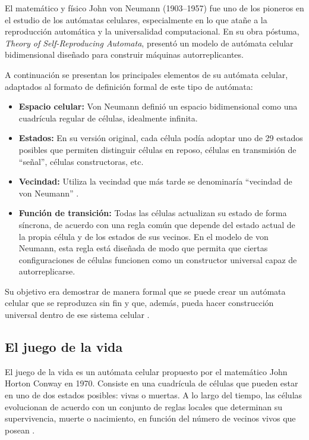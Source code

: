 El matemático y físico John von Neumann (1903--1957) fue uno de los pioneros en el estudio de los autómatas celulares, especialmente en lo que atañe a la reproducción automática y la universalidad computacional. En su obra póstuma, \textit{Theory of Self-Reproducing Automata}, presentó un modelo de autómata celular bidimensional diseñado para construir máquinas autorreplicantes. 

A continuación se presentan los principales elementos de su autómata celular, adaptados al formato de definición formal de este tipo de autómata:

\begin{itemize}
	
	\item \textbf{Espacio celular:} Von Neumann definió un espacio bidimensional como una cuadrícula regular de células, idealmente infinita.
	
	\item \textbf{Estados:} En su versión original, cada célula podía adoptar uno de 29 estados posibles que permiten distinguir células en reposo, células en transmisión de ``señal'', células constructoras, etc. 

	\item \textbf{Vecindad:} Utiliza la vecindad que más tarde se denominaría ``vecindad de von Neumann'' \cite{weisstein2002_neumann}.
	
	\item \textbf{Función de transición:} Todas las células actualizan su estado de forma síncrona, de acuerdo con una regla común que depende del estado actual de la propia célula y de los estados de sus vecinos. En el modelo de von Neumann, esta regla está diseñada de modo que permita que ciertas configuraciones de células funcionen como un constructor universal capaz de autorreplicarse.
	
\end{itemize}

Su objetivo era demostrar de manera formal que se puede crear un autómata celular que se reproduzca sin fin y que, además, pueda hacer construcción universal dentro de ese sistema celular \cite{neumann1966_ca, wikipedia2016_ca}. 

\subsection{El juego de la vida}

El juego de la vida es un autómata celular propuesto por el matemático John Horton Conway en 1970. Consiste en una cuadrícula de células que pueden estar en uno de dos estados posibles: vivas o muertas. A lo largo del tiempo, las células evolucionan de acuerdo con un conjunto de reglas locales que determinan su supervivencia, muerte o nacimiento, en función del número de vecinos vivos que posean \cite{thoma2020_life}.

